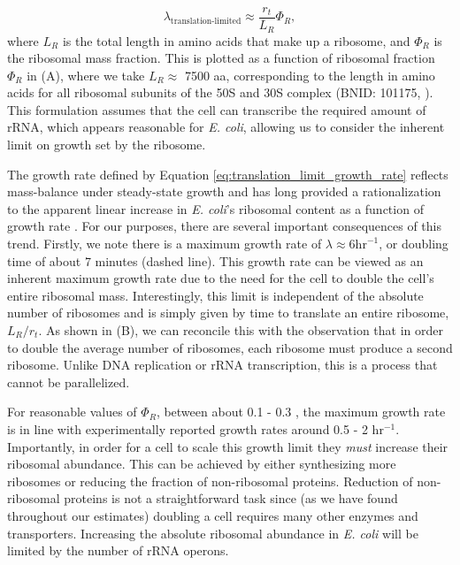 \begin{equation}
\lambda_{\textrm{translation-limited}} \approx \frac{r_t}{L_R}  \Phi_R,
\label{eq:translation_limit_growth_rate}
\end{equation}
where $L_R$ is the total length in amino acids that make up a ribosome, and
$\Phi_R$ is the ribosomal mass fraction. This is plotted as a function of
ribosomal fraction $\Phi_R$ in (A), where we take $L_R
\approx$ 7500 aa, corresponding to the length in amino acids for all ribosomal
subunits of the 50S and 30S complex (BNID: 101175, \citep{milo2010}). This
formulation assumes that the cell can transcribe the required amount of rRNA,
which appears reasonable for \textit{E. coli}, allowing us to
consider the inherent limit on growth set by the ribosome.

The growth rate defined by Equation \ref{eq:translation_limit_growth_rate}
reflects mass-balance under steady-state growth and has long provided a
rationalization to the apparent linear increase in \textit{E. coli}'s
ribosomal content as a function of growth rate \citep{Goldberger1979,
scott2010}. For our purposes, there are several important consequences of
this trend. Firstly, we note there is a maximum growth rate of $\lambda
\approx 6 \text{hr}^{-1}$, or doubling time of about 7 minutes (dashed line).
This growth rate can be viewed as an inherent maximum growth rate due to the
need for the cell to double the cell's entire ribosomal mass. Interestingly,
this limit is independent of the absolute number of ribosomes and is simply
given by time to translate an entire ribosome, $L_R/ r_t$. As shown in
(B), we can reconcile this with the observation that in
order to double the average number of ribosomes, each ribosome must produce a
second ribosome. Unlike DNA replication or rRNA transcription, this is a
process that cannot be parallelized.

For reasonable values of $\Phi_R$, between about 0.1 - 0.3 \citep{scott2010},
the maximum growth rate is in line with experimentally reported growth rates
around 0.5 - 2 hr$^{-1}$.
Importantly, in order for a cell to scale this growth
limit they \textit{must} increase their ribosomal abundance.
This can be achieved by either synthesizing more ribosomes or reducing the
fraction of non-ribosomal proteins. Reduction of non-ribosomal proteins is not
a straightforward task since (as we have found throughout our estimates) doubling a
cell requires many other enzymes and transporters. Increasing the absolute
ribosomal abundance in \textit{E. coli} will be limited by the number of
rRNA operons.

